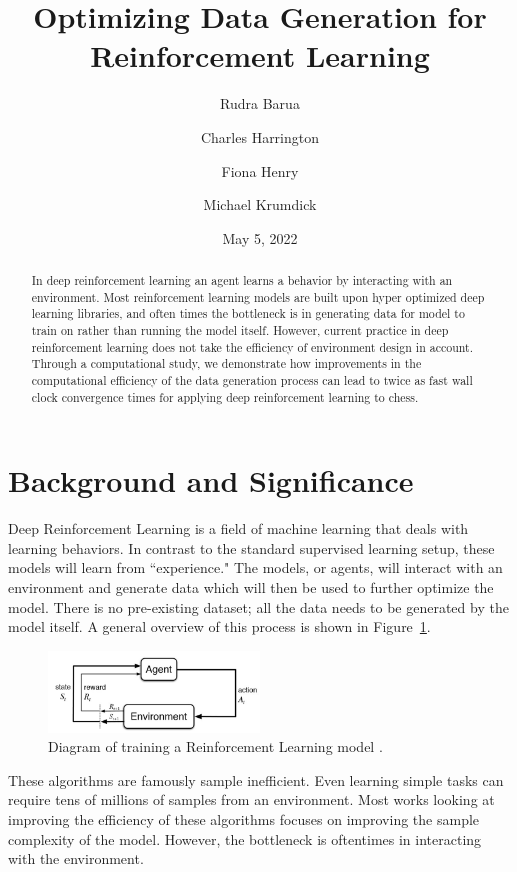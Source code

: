 \documentclass[12pt]{article}
\title{Optimizing Data Generation for Reinforcement Learning}
\author[1]{Rudra Barua}
\author[1]{Charles Harrington}
\author[1]{Fiona Henry}
\author[1]{Michael Krumdick}
\affil[1]{Harvard University}
\date{May 5, 2022}
\begin{document}
\maketitle

\begin{abstract} 
In deep reinforcement learning an agent learns a behavior by interacting with an environment. Most reinforcement learning models are built upon hyper optimized deep learning libraries, and often times the bottleneck is in generating data for model to train on rather than running the model itself. However, current practice in deep reinforcement learning does not take the efficiency of environment design in account. Through a computational study, we demonstrate how improvements in the computational efficiency of the data generation process can lead to twice as fast wall clock convergence times for applying deep reinforcement learning to chess.
\end{abstract}

\section{Background and Significance}\label{sec:background}
      
Deep Reinforcement Learning is a field of machine learning that deals with learning behaviors. In contrast to the standard supervised learning setup, these models will learn from ``experience." The models, or agents, will interact with an environment and generate data which will then be used to further optimize the model. There is no pre-existing dataset; all the data needs to be generated by the model itself. A general overview of this process is shown in Figure~\ref{fig:rl-diagram}.

\begin{figure}[H]
    \centering
    \includegraphics[width=0.5\textwidth]{plots/rl-diagram.jpg}
    \caption{Diagram of training a Reinforcement Learning model \cite{bhatt_5_2018}.}
    \label{fig:rl-diagram}
\end{figure}

These algorithms are famously sample inefficient. Even learning simple tasks can require tens of millions of samples from an environment. Most works looking at improving the efficiency of these algorithms focuses on improving the sample complexity of the model. However, the bottleneck is oftentimes in interacting with the environment.
\end{document}
